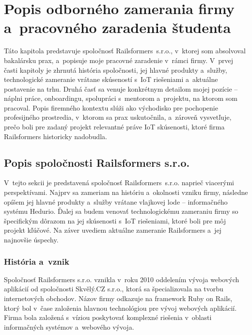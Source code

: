 \chapter{Popis odborného zamerania firmy a~pracovného zaradenia študenta}
\label{sec:Firma}


Táto kapitola predstavuje spoločnosť Railsformers~s.r.o., v~ktorej som absolvoval bakalársku prax, a~popisuje moje pracovné zaradenie v~rámci firmy. V~prvej časti kapitoly je zhrnutá história spoločnosti, jej hlavné produkty a~služby, technologické zameranie vrátane skúseností s~IoT riešeniami a~aktuálne postavenie na trhu. Druhá časť sa venuje konkrétnym detailom mojej pozície -- náplni práce, onboardingu, spolupráci s~mentorom a~projektu, na ktorom som pracoval. Popis firemného kontextu slúži ako východisko pre pochopenie profesijného prostredia, v~ktorom sa prax uskutočnila, a~zároveň vysvetľuje, prečo boli pre zadaný projekt relevantné práve IoT skúsenosti, ktoré firma Railsformers historicky nadobudla.

\section{Popis spoločnosti Railsformers s.r.o.}
\label{sec:PopisSpolecnosti}

V~tejto sekcii je predstavená spoločnosť Railsformers~s.r.o. naprieč viacerými perspektívami. Najprv sa zameriam na históriu a~okolnosti vzniku firmy, následne opíšem jej hlavné produkty a~služby vrátane vlajkovej lode -- informačného systému Hedurio. Ďalej sa budem venovať technologickému zameraniu firmy so špecifickým dôrazom na jej skúsenosti s~IoT riešeniami, ktoré boli pre môj projekt kľúčové. Na záver uvediem aktuálne zameranie Railsformers a~jej najnovšie úspechy.

\subsection{História a~vznik}
\label{sec:Historie}

Spoločnosť Railsformers s.r.o. vznikla v~roku 2010 oddelením vývoja webových aplikácií od spoločnosti Skvělý.CZ s.r.o., ktorá sa špecializovala na tvorbu internetových obchodov. Názov firmy odkazuje na framework Ruby on Rails, ktorý bol v~čase založenia hlavnou technológiou pre vývoj webových aplikácií. Firma bola založená s~víziou poskytovať komplexné riešenia v~oblasti informačných systémov a~webového vývoja.

